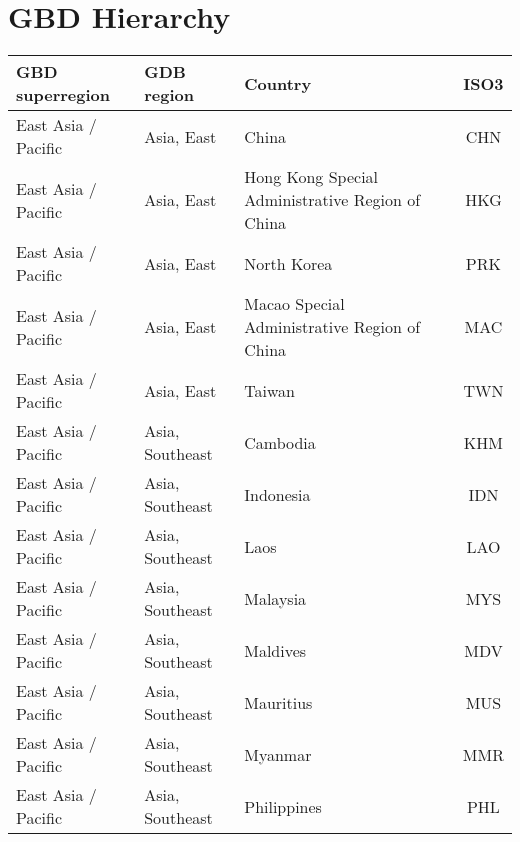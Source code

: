 \chapter{GBD Hierarchy}

\begin{longtable}{|p{3cm}|p{3.5cm}|p{5cm}|c|}
\hline
         GBD superregion &                   GDB region &                                  Country & ISO3 \\
\hline
           East Asia / Pacific &                   Asia, East &                                             China &  CHN \\
           East Asia / Pacific &                   Asia, East &  Hong Kong Special Administrative Region of China &  HKG \\
           East Asia / Pacific &                   Asia, East &                                       North Korea &  PRK \\
           East Asia / Pacific &                   Asia, East &      Macao Special Administrative Region of China &  MAC \\
           East Asia / Pacific &                   Asia, East &                                            Taiwan &  TWN \\
           East Asia / Pacific &              Asia, Southeast &                                          Cambodia &  KHM \\
           East Asia / Pacific &              Asia, Southeast &                                         Indonesia &  IDN \\
           East Asia / Pacific &              Asia, Southeast &                                              Laos &  LAO \\
           East Asia / Pacific &              Asia, Southeast &                                          Malaysia &  MYS \\
           East Asia / Pacific &              Asia, Southeast &                                          Maldives &  MDV \\
           East Asia / Pacific &              Asia, Southeast &                                         Mauritius &  MUS \\
           East Asia / Pacific &              Asia, Southeast &                                           Myanmar &  MMR \\
           East Asia / Pacific &              Asia, Southeast &                                       Philippines &  PHL \\

\end{longtable}
